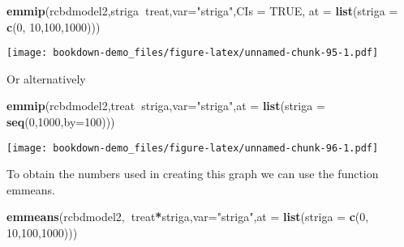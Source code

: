 \documentclass[]{book}
\newenvironment{Shaded}{\begin{snugshade}}{\end{snugshade}}
\newcommand{\KeywordTok}[1]{\textcolor[rgb]{0.13,0.29,0.53}{\textbf{#1}}}
\newcommand{\DataTypeTok}[1]{\textcolor[rgb]{0.13,0.29,0.53}{#1}}
\newcommand{\DecValTok}[1]{\textcolor[rgb]{0.00,0.00,0.81}{#1}}
\newcommand{\StringTok}[1]{\textcolor[rgb]{0.31,0.60,0.02}{#1}}
\newcommand{\OtherTok}[1]{\textcolor[rgb]{0.56,0.35,0.01}{#1}}
\newcommand{\OperatorTok}[1]{\textcolor[rgb]{0.81,0.36,0.00}{\textbf{#1}}}
\newcommand{\NormalTok}[1]{#1}
\theoremstyle{definition}
\theoremstyle{definition}
\theoremstyle{definition}
\theoremstyle{remark}
\begin{document}
\begin{Shaded}
\begin{Highlighting}[]
\KeywordTok{emmip}\NormalTok{(rcbdmodel2,striga}\OperatorTok{~}\NormalTok{treat,}\DataTypeTok{var=}\StringTok{"striga"}\NormalTok{,}\DataTypeTok{CIs =} \OtherTok{TRUE}\NormalTok{, }\DataTypeTok{at =} \KeywordTok{list}\NormalTok{(}\DataTypeTok{striga =} \KeywordTok{c}\NormalTok{(}\DecValTok{0}\NormalTok{, }\DecValTok{10}\NormalTok{,}\DecValTok{100}\NormalTok{,}\DecValTok{1000}\NormalTok{)))}
\end{Highlighting}
\end{Shaded}

\texttt{[image: bookdown-demo\_files/figure-latex/unnamed-chunk-95-1.pdf]}

Or alternatively

\begin{Shaded}
\begin{Highlighting}[]
\KeywordTok{emmip}\NormalTok{(rcbdmodel2,treat}\OperatorTok{~}\NormalTok{striga,}\DataTypeTok{var=}\StringTok{"striga"}\NormalTok{,}\DataTypeTok{at =} \KeywordTok{list}\NormalTok{(}\DataTypeTok{striga =} \KeywordTok{seq}\NormalTok{(}\DecValTok{0}\NormalTok{,}\DecValTok{1000}\NormalTok{,}\DataTypeTok{by=}\DecValTok{100}\NormalTok{)))}
\end{Highlighting}
\end{Shaded}

\texttt{[image: bookdown-demo\_files/figure-latex/unnamed-chunk-96-1.pdf]}

To obtain the numbers used in creating this graph we can use the
function emmeans.

\begin{Shaded}
\begin{Highlighting}[]
\KeywordTok{emmeans}\NormalTok{(rcbdmodel2,}\OperatorTok{~}\NormalTok{treat}\OperatorTok{*}\NormalTok{striga,}\DataTypeTok{var=}\StringTok{"striga"}\NormalTok{,}\DataTypeTok{at =} \KeywordTok{list}\NormalTok{(}\DataTypeTok{striga =} \KeywordTok{c}\NormalTok{(}\DecValTok{0}\NormalTok{, }\DecValTok{10}\NormalTok{,}\DecValTok{100}\NormalTok{,}\DecValTok{1000}\NormalTok{)))}
\end{Highlighting}
\end{Shaded}
\end{document}
